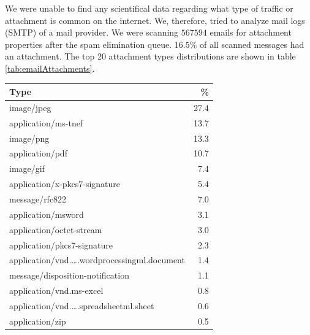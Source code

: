 We were unable to find any scientifical data regarding what type of traffic or attachment is common on the internet. We, therefore, tried to analyze mail logs (SMTP) of a mail provider. We were scanning $567594$ emails for attachment properties after the spam elimination queue. $16.5\%$ of all scanned messages had an attachment. The top 20 attachment types distributions are shown in table \ref{tab:emailAttachments}.
\begin{table}[H]\small
	
	\begin{tabular}{l|r}\hline
		Type                                                                        & \%\\\hline
		image/jpeg                                                                  &    27.4\\
		application/ms-tnef                                                            &    13.7\\
		image/png                                                                   &    13.3\\
		application/pdf                                                             &    10.7\\
		image/gif                                                                   &    7.4\\
		application/x-pkcs7-signature                                               &    5.4\\
		message/rfc822                                                              &    7.0\\
		application/msword                                                          &    3.1\\
		application/octet-stream                                                    &    3.0\\
		application/pkcs7-signature                                                 &    2.3\\
		application/vnd.\ldots.wordprocessingml.document                            &     1.4\\
		message/disposition-notification                                            &    1.1\\
		application/vnd.ms-excel                                                    &    0.8\\
		application/vnd.\ldots.spreadsheetml.sheet                                  &    0.6\\
		application/zip                                                             &    0.5\\

\end{tabular}
\end{table}

